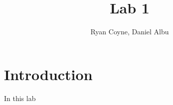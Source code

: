 \documentclass{article}
\title{Lab 1}
\author{Ryan Coyne, Daniel Albu}
\begin{document}
    \maketitle

    \section{Introduction}
    In this lab
\end{document}
